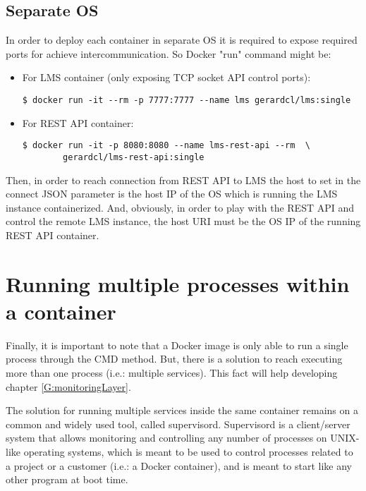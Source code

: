 \subsection{Separate OS}

In order to deploy each container in separate OS it is required to expose required ports for achieve intercommunication. So Docker "run" command might be:
\begin{itemize}
\item For LMS container (only exposing TCP socket API control ports): \hfill

\begin{verbatim}
$ docker run -it --rm -p 7777:7777 --name lms gerardcl/lms:single
\end{verbatim}
\item For REST API container: \hfill

\begin{verbatim}
$ docker run -it -p 8080:8080 --name lms-rest-api --rm  \
		gerardcl/lms-rest-api:single
\end{verbatim}
\end{itemize}

Then, in order to reach connection from REST API to LMS the host to set in the connect JSON parameter is the host IP of the OS which is running the LMS instance containerized. And, obviously, in order to play with the REST API and control the remote LMS instance, the host URI must be the OS IP of the running REST API container.

\section{Running multiple processes within a container}

Finally, it is important to note that a Docker image is only able to run a single process through the CMD method. But, there is a solution to reach executing more than one process (i.e.: multiple services). This fact will help developing chapter \ref{G:monitoringLayer}.

The solution for running multiple services inside the same container remains on a common and widely used tool, called supervisord. Supervisord is a client/server system that allows monitoring and controlling any number of processes on UNIX-like operating systems, which is meant to be used to control processes related to a project or a customer (i.e.: a Docker container), and is meant to start like any other program at boot time.

